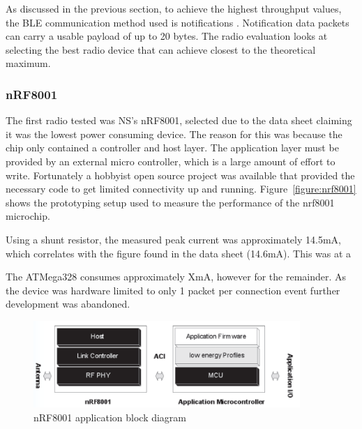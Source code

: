 \documentclass[]{article}
\begin{document}
As discussed in the previous section, to achieve the highest throughput values, the \ac{BLE} communication method used is notifications . Notification data packets can carry a usable payload of up to 20 bytes. The radio evaluation looks at selecting the best radio device that can achieve closest to the theoretical maximum.


\subsubsection{nRF8001}
The first radio tested was \ac{NS}'s nRF8001, selected due to the data sheet claiming it was the lowest power consuming device. The reason for this was because the chip only contained a controller and host layer. The application layer must be provided by an external micro controller, which is a large amount of effort to write. Fortunately a hobbyist open source project\cite{Guan2013} was available that provided the necessary code to get limited connectivity up and running. Figure~\ref{figure:nrf8001} shows the prototyping setup used to measure the performance of the nrf8001 microchip. 

Using a shunt resistor, the measured peak current was approximately 14.5mA, which correlates with the figure found in the data sheet (14.6mA). This was at a 

The ATMega328 consumes approximately XmA, however for the remainder. As the device was hardware limited to only 1 packet per connection event further development was abandoned.

\begin{figure}[h]
	\begin{center}
		\includegraphics[width = 0.9\textwidth]{nrf8001stack}
	\end{center}
	\caption{nRF8001 application block diagram }
	\label{fig:nrf8001stack}
\end{figure}
\end{document}
